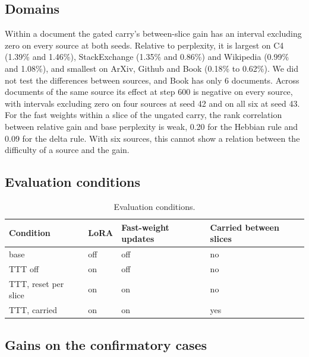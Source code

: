 \documentclass[10pt]{article} %
\begin{document}
\subsection{Domains}
\label{app-domains}

Within a document the gated carry's between-slice gain has an interval excluding zero on every source at both seeds. Relative to perplexity, it is largest on C4 (1.39\% and 1.46\%), StackExchange (1.35\% and 0.86\%) and Wikipedia (0.99\% and 1.08\%), and smallest on ArXiv, Github and Book (0.18\% to 0.62\%). We did not test the differences between sources, and Book has only 6 documents. Across documents of the same source its effect at step 600 is negative on every source, with intervals excluding zero on four sources at seed 42 and on all six at seed 43. For the fast weights within a slice of the ungated carry, the rank correlation between relative gain and base perplexity is weak, 0.20 for the Hebbian rule and 0.09 for the delta rule. With six sources, this cannot show a relation between the difficulty of a source and the gain.

\subsection{Evaluation conditions}
\label{app-conditions}

\begin{table}[H]
  \centering
  \small
  \begin{tabular}{llll}
    \toprule
    Condition & LoRA & Fast-weight updates & Carried between slices \\
    \midrule
    base & off & off & no \\
    TTT off & on & off & no \\
    TTT, reset per slice & on & on & no \\
    TTT, carried & on & on & yes \\
    \bottomrule
  \end{tabular}
  \caption{Evaluation conditions.}
  \label{tab-conditions}
\end{table}

\subsection{Gains on the confirmatory cases}
\label{app-conf}
\end{document}
